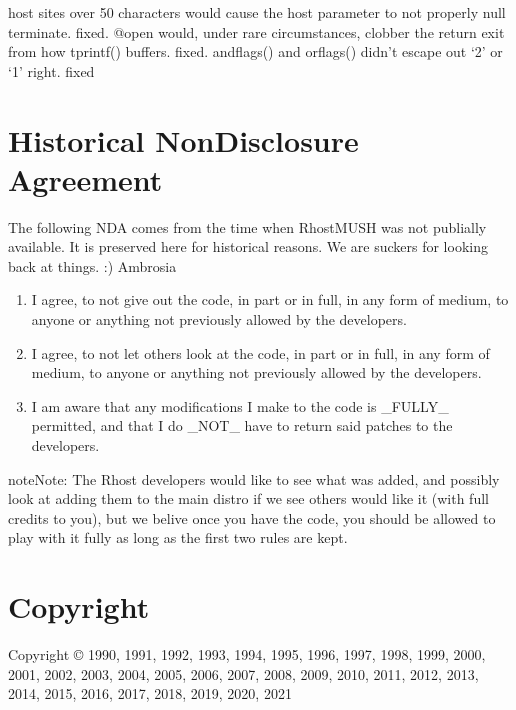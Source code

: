 \documentclass[letterpaper,10pt,english]{sphinxmanual}
\begin{document}
\sphinxAtStartPar
host sites over 50 characters would cause the host parameter to not properly null terminate.  \sphinxhyphen{} fixed.
@open would, under rare circumstances, clobber the return exit from how tprintf() buffers. \sphinxhyphen{}fixed.
andflags() and orflags() didn’t escape out ‘2’ or ‘1’ right. \sphinxhyphen{} fixed


\chapter{Historical Non\sphinxhyphen{}Disclosure Agreement}
\label{\detokenize{nda:historical-non-disclosure-agreement}}\label{\detokenize{nda::doc}}
\sphinxAtStartPar
The following NDA comes from the time when RhostMUSH was not publially
available. It is preserved here for historical reasons. We are suckers for
looking back at things. :)
\textendash{}Ambrosia
\begin{enumerate}
%
\item {} 
\sphinxAtStartPar
I agree, to not give out the code, in part or in full, in any form of
medium, to anyone or anything not previously allowed by the developers.

\item {} 
\sphinxAtStartPar
I agree, to not let others look at the code, in part or in full, in
any form of medium, to anyone or anything not previously allowed by the
developers.

\item {} 
\sphinxAtStartPar
I am aware that any modifications I make to the code is \_FULLY\_
permitted, and that I do \_NOT\_ have to return said patches to the
developers.

\end{enumerate}

\begin{sphinxadmonition}{note}{Note:}
\sphinxAtStartPar
The Rhost developers would like to see what was added, and possibly
look at adding them to the main distro if we see others would like
it (with full credits to you), but we belive once you have the code,
you should be allowed to play with it fully as long as the first two
rules are kept.
\end{sphinxadmonition}


\chapter{Copyright}
\label{\detokenize{index:copyright}}
\sphinxAtStartPar
Copyright © 1990, 1991, 1992, 1993, 1994, 1995, 1996, 1997, 1998, 1999,
2000, 2001, 2002, 2003, 2004, 2005, 2006, 2007, 2008, 2009, 2010, 2011, 2012,
2013, 2014, 2015, 2016, 2017, 2018, 2019, 2020, 2021
\end{document}
